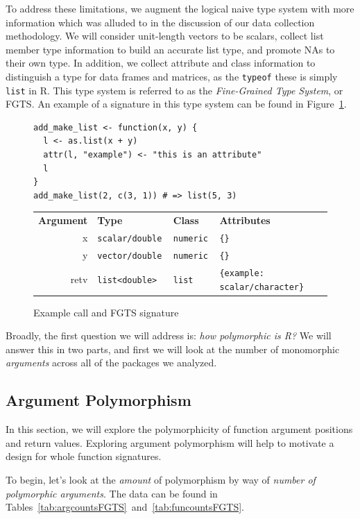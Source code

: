 \documentclass[acmsmall,10pt,review,anonymous]{acmart}\settopmatter{printfolios=true,printccs=false,printacmref=false}
\newcommand{\code}[1]{\lstinline|#1|\xspace}
\begin{document}
To address these limitations, we augment the logical naive type system with
more information which was alluded to in the discussion of our data
collection methodology.  We will consider unit-length vectors to be scalars,
collect list member type information to build an accurate list type, and
promote NAs to their own type.  In addition, we collect attribute and class
information to distinguish a type for data frames and matrices, as the
\code{typeof} these is simply {\tt list} in R.  This type system is referred
to as the {\it Fine-Grained Type System}, or FGTS.  An example of a signature in
this type system can be found in Figure~\ref{fig:exFGTS}.

\begin{figure}[!hb]{\small\begin{lstlisting}[style=R]
add_make_list <- function(x, y) {
  l <- as.list(x + y)
  attr(l, "example") <- "this is an attribute"
  l
}
add_make_list(2, c(3, 1)) # => list(5, 3)
\end{lstlisting}}
\begin{tabular}{@{}r|l|l|l@{}}\hline
\bf Argument & \bf Type & \bf Class &\bf Attributes \\
x & \tt scalar/double & \tt numeric & \tt \{\} \\
y & \tt vector/double & \tt numeric & \tt \{\} \\
retv & \tt list<double> & \tt list & \tt \{example: scalar/character\}  
\end{tabular}
\caption{Example call and FGTS signature}\label{fig:exFGTS}\end{figure}

Broadly, the first question we will address is: {\it how polymorphic is R?} 
We will answer this in two parts, and first we will look at the number of monomorphic {\it arguments} across all of the packages we analyzed.  

%
%
%
%
\subsection{Argument Polymorphism}

In this section, we will explore the polymorphicity of function argument positions and return values.
Exploring argument polymorphism will help to motivate a design for whole function signatures.

To begin, let's look at the {\it amount} of polymorphism by way of {\it number of polymorphic arguments}.
The data can be found in Tables~\ref{tab:argcountsFGTS}~and~\ref{tab:funcountsFGTS}.
\end{document}
